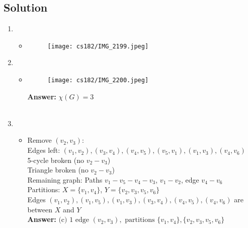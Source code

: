 \documentclass[11pt]{article}
\begin{document}
    \subsection*{Solution}
    \begin{enumerate}[label=(\alph*)]
        \item
        \begin{itemize}
            \item[] 

                \begin{figure}[htbp] %
        \centering %
        \texttt{[image: cs182/IMG\_2199.jpeg]} %
        \label{fig:your_image_label} %
                \end{figure}
            
        \end{itemize}
        \item
        \begin{itemize}
            \item[] 
                \begin{figure}[htbp] %
        \centering %
        \texttt{[image: cs182/IMG\_2200.jpeg]} %
        \label{fig:your_image_label} %
                \end{figure}
            
            \textbf{Answer:} $\chi(G) = 3$  \\ \\
        \end{itemize}
        \item
        \begin{itemize}
            \item[] 

Remove \( (v_2, v_3) \): \\
Edges left: \( (v_1, v_2), (v_3, v_4), (v_4, v_5), (v_5, v_1), (v_1, v_3), (v_4, v_6) \) \\
5-cycle broken (no \( v_2-v_3 \)) \\
Triangle broken (no \( v_2-v_3 \)) \\
Remaining graph: Paths \( v_1-v_5-v_4-v_3 \), \( v_1-v_2 \), edge \( v_4-v_6 \) \\
Partitions: \( X = \{v_1, v_4\} \), \( Y = \{v_2, v_3, v_5, v_6\} \) \\
Edges \( (v_1, v_2), (v_1, v_5), (v_1, v_3), (v_3, v_4), (v_4, v_5), (v_4, v_6) \) are between \( X \) and \( Y \) \\

\textbf{Answer: }
\(
\text{(c) } 1 \text{ edge } (v_2, v_3), \text{ partitions } \{v_1, v_4\}, \{v_2, v_3, v_5, v_6\}
\)

        \end{itemize}
    \end{enumerate}
\end{document}

